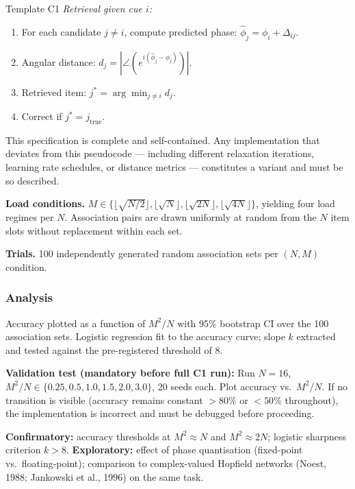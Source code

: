 \documentclass[11pt, a4paper]{article}
\begin{document}
\begin{predbox}{Template C1}
\noindent\textit{Retrieval given cue $i$:}
\begin{enumerate}[topsep=2pt, itemsep=1pt]
  \item For each candidate $j \neq i$, compute predicted phase:
    $\hat{\phi}_j = \phi_i + \Delta_{ij}$.
  \item Angular distance: $d_j = |\angle(e^{i(\hat{\phi}_j - \phi_j)})|$.
  \item Retrieved item: $j^* = \arg\min_{j \neq i} d_j$.
  \item Correct if $j^* = j_\text{true}$.
\end{enumerate}

This specification is complete and self-contained.  Any implementation that
deviates from this pseudocode — including different relaxation iterations,
learning rate schedules, or distance metrics — constitutes a variant and must
be so described.

\textbf{Load conditions.}
$M \in \bigl\{
  \lfloor\sqrt{N/2}\rfloor,
  \lfloor\sqrt{N}\rfloor,
  \lfloor\sqrt{2N}\rfloor,
  \lfloor\sqrt{4N}\rfloor
\bigr\}$,
yielding four load regimes per $N$.  Association pairs are drawn uniformly at
random from the $N$ item slots without replacement within each set.

\textbf{Trials.}
100 independently generated random association sets per $(N, M)$ condition.

\subsubsection{Analysis}

Accuracy plotted as a function of $M^2/N$ with 95\% bootstrap CI over the
100 association sets.  Logistic regression fit to the accuracy curve;
slope $k$ extracted and tested against the pre-registered threshold of 8.

\textbf{Validation test (mandatory before full C1 run):}  Run $N = 16$,
$M^2/N \in \{0.25, 0.5, 1.0, 1.5, 2.0, 3.0\}$, 20 seeds each.  Plot
accuracy vs.\ $M^2/N$.  If no transition is visible (accuracy remains
constant $> 80\%$ or $< 50\%$ throughout), the implementation is incorrect
and must be debugged before proceeding.

\textbf{Confirmatory:} accuracy thresholds at $M^2 \approx N$ and
$M^2 \approx 2N$; logistic sharpness criterion $k > 8$.
\textbf{Exploratory:} effect of phase quantisation (fixed-point vs.\
floating-point); comparison to complex-valued Hopfield networks (Noest, 1988;
Jankowski et al., 1996) on the same task.

\end{predbox}
\end{document}

